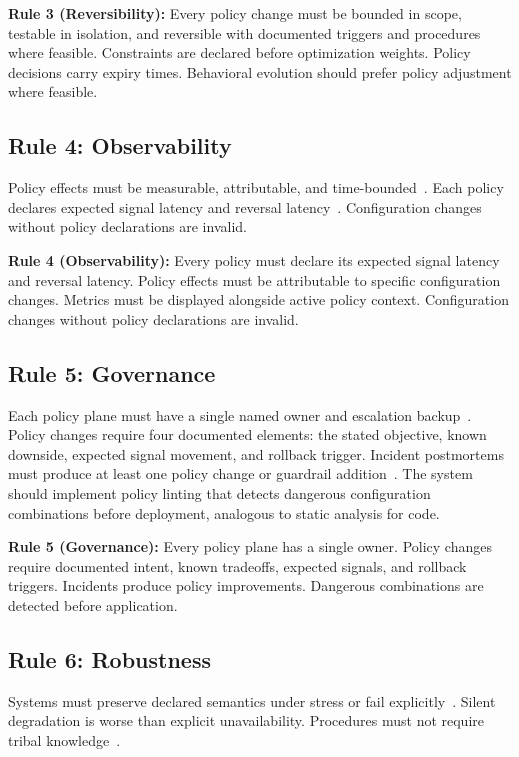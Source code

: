 \documentclass[conference]{IEEEtran}
\newcommand{\majorrule}[2]{%
    \vspace{0.5em}\noindent\textbf{\textcolor{rulecolor}{Rule #1:}} #2\par\vspace{0.5em}}
\begin{document}
{\majorrule{3 (Reversibility)}{Every policy change must be bounded in scope, testable in isolation, and reversible with documented triggers and procedures where feasible. Constraints are declared before optimization weights. Policy decisions carry expiry times. Behavioral evolution should prefer policy adjustment where feasible.}

{\color{red}
\subsection{Rule 4: Observability}
Policy effects must be measurable, attributable, and time-bounded~\cite{observability2026}. Each policy declares expected signal latency and reversal latency~\cite{controltheory}. Configuration changes without policy declarations are invalid.}

\majorrule{4 (Observability)}{Every policy must declare its expected signal latency and reversal latency. Policy effects must be attributable to specific configuration changes. Metrics must be displayed alongside active policy context. Configuration changes without policy declarations are invalid.}

\subsection{Rule 5: Governance}

{\color{red}
Each policy plane must have a single named owner and escalation backup~\cite{leveson,pourmajidi2025governance,cncf2023policy,cncf2023governance}. Policy changes require four documented elements: the stated objective, known downside, expected signal movement, and rollback trigger. Incident postmortems must produce at least one policy change or guardrail addition~\cite{sre}. The system should implement policy linting that detects dangerous configuration combinations before deployment, analogous to static analysis for code.}

\majorrule{5 (Governance)}{Every policy plane has a single owner. Policy changes require documented intent, known tradeoffs, expected signals, and rollback triggers. Incidents produce policy improvements. Dangerous combinations are detected before application.}

{\color{red}
\subsection{Rule 6: Robustness}
Systems must preserve declared semantics under stress or fail explicitly~\cite{corbato1972,leveson}. Silent degradation is worse than explicit unavailability. Procedures must not require tribal knowledge~\cite{dijkstra1972humble,simon}.}

}
\end{document}
